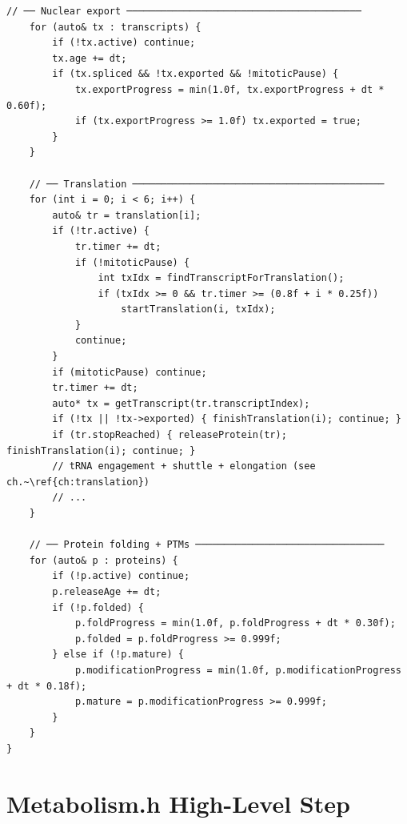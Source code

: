 \documentclass[11pt,letterpaper,twoside,openany]{book}
\begin{document}
\begin{lstlisting}[language={[ISO]C++}]
    // ── Nuclear export ─────────────────────────────────────────
    for (auto& tx : transcripts) {
        if (!tx.active) continue;
        tx.age += dt;
        if (tx.spliced && !tx.exported && !mitoticPause) {
            tx.exportProgress = min(1.0f, tx.exportProgress + dt * 0.60f);
            if (tx.exportProgress >= 1.0f) tx.exported = true;
        }
    }

    // ── Translation ────────────────────────────────────────────
    for (int i = 0; i < 6; i++) {
        auto& tr = translation[i];
        if (!tr.active) {
            tr.timer += dt;
            if (!mitoticPause) {
                int txIdx = findTranscriptForTranslation();
                if (txIdx >= 0 && tr.timer >= (0.8f + i * 0.25f))
                    startTranslation(i, txIdx);
            }
            continue;
        }
        if (mitoticPause) continue;
        tr.timer += dt;
        auto* tx = getTranscript(tr.transcriptIndex);
        if (!tx || !tx->exported) { finishTranslation(i); continue; }
        if (tr.stopReached) { releaseProtein(tr); finishTranslation(i); continue; }
        // tRNA engagement + shuttle + elongation (see ch.~\ref{ch:translation})
        // ...
    }

    // ── Protein folding + PTMs ─────────────────────────────────
    for (auto& p : proteins) {
        if (!p.active) continue;
        p.releaseAge += dt;
        if (!p.folded) {
            p.foldProgress = min(1.0f, p.foldProgress + dt * 0.30f);
            p.folded = p.foldProgress >= 0.999f;
        } else if (!p.mature) {
            p.modificationProgress = min(1.0f, p.modificationProgress + dt * 0.18f);
            p.mature = p.modificationProgress >= 0.999f;
        }
    }
}
\end{lstlisting}

\chapter{Metabolism.h High-Level Step}
\label{ch:metab-pseudo}
\end{document}
